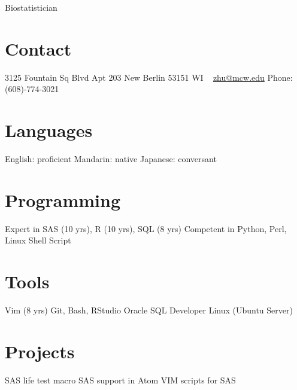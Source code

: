 \documentclass[11pt, print]{friggeri-cv}
\begin{document}
       {Biostatistician}

\begin{aside}
  \section{Contact}
    3125 Fountain Sq Blvd
    Apt 203
    New Berlin
    53151 WI
    ~
    \href{mailto:zhu@mcw.edu}{zhu@mcw.edu}
    Phone: (608)-774-3021
  \section{Languages}
    English: proficient
    Mandarin: native
    Japanese: conversant
  \section{Programming}
    Expert in SAS (10 yrs),
    R (10 yrs), SQL (8 yrs)
    Competent in Python,
    Perl, Linux Shell Script
  \section{Tools}
    Vim (8 yrs)
    Git, Bash, RStudio
    Oracle SQL Developer
    Linux (Ubuntu Server)
  \section{Projects}
    SAS life test macro
    SAS support in Atom
    VIM scripts for SAS
\end{aside}


\end{document}
